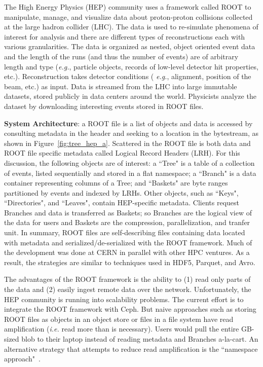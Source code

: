The High Energy Physics (HEP) community uses a framework called ROOT to
manipulate, manage, and visualize data about proton-proton collisions collected
at the large hadron collider (LHC). The data is used to re-simulate phenomena
of interest for analysis and there are different types of reconstructions each
with various granularities. The data is organized as nested, object oriented
event data and the length of the runs (and thus the number of events) are of
arbitrary length and type ({\it e.g.}, particle objects, records of low-level
detector hit properties, etc.).  Reconstruction takes detector conditions ({\it
e.g.}, alignment, position of the beam, etc.) as input.  Data is streamed from
the LHC into large immutable datasets, stored publicly in data centers around
the world.  Physicists analyze the dataset by downloading interesting events
stored in ROOT files.


\textbf{System Architecture}: a ROOT file is a list of objects and data is
accessed by consulting metadata in the header and seeking to a location in the
bytestream, as shown in Figure~\ref{fig:tree_hep_a}. Scattered in the ROOT file
is both data and ROOT file specific metadata called Logical Record Headers
(LRH).  For this discussion, the following objects are of interest: a ``Tree"
is a table of a collection of events, listed sequentially and stored in a flat
namespace; a ``Branch" is a data container representing columns of a Tree; and
``Baskets" are byte ranges partitioned by events and indexed by LRHs.  Other
objects, such as ``Keys", ``Directories", and ``Leaves", contain HEP-specific
metadata.  Clients request Branches and data is transferred as Baskets; so
Branches are the logical view of the data for users and Baskets are the
compression, parallelization, and tranfer unit. In summary, ROOT files are
self-describing files containing data located with metadata and
serialized/de-serialized with the ROOT framework.  Much of the development was
done at CERN in parallel with other HPC ventures. As a result, the strategies
are similar to techniques used in HDF5, Parquet, and Avro.

The advantages of the ROOT framework is the ability to (1) read only parts of
the data and (2) easily ingest remote data over the network.  Unfortunately,
the HEP community is running into scalability problems.  The current effort is
to integrate the ROOT framework with Ceph. But naive approaches such as storing
ROOT files as objects in an object store or files in a file system have read
amplification ({\it i.e.} read more than is necessary). Users would pull the
entire GB-sized blob to their laptop instead of reading metadata and Branches
a-la-cart. An alternative strategy that attempts to reduce read amplification
is the ``namespace approach"~\cite{pivarski:indico17-root}.

